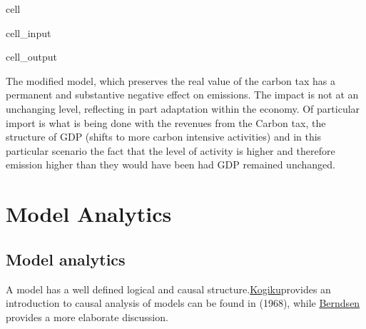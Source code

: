 \documentclass[letterpaper,10pt,english]{jupyterBook}
\begin{document}
\begin{sphinxuseclass}{cell}\begin{sphinxVerbatimInput}

\begin{sphinxuseclass}{cell_input}
\begin{sphinxVerbatim}[commandchars=\\\{\}]
\PYG{p}{[}\PYG{p}{]}
\end{sphinxVerbatim}

\end{sphinxuseclass}\end{sphinxVerbatimInput}
\begin{sphinxVerbatimOutput}

\begin{sphinxuseclass}{cell_output}
\noindent{}

\end{sphinxuseclass}\end{sphinxVerbatimOutput}

\end{sphinxuseclass}
\sphinxAtStartPar
The modified model, which preserves the real value of the carbon tax has a permanent and substantive negative effect on emissions. The impact is not at an unchanging level, reflecting in part adaptation within the economy. Of particular import is what is being done with the revenues from the Carbon tax, the structure of GDP (shifts to more carbon intensive activities) and in this particular scenario the fact that the level of activity is higher and therefore emission higher than they would have been had GDP remained unchanged.

\sphinxstepscope


\part{Model Analytics}

\sphinxstepscope


\chapter{Model analytics}
\label{\detokenize{content/06_ModelAnalytics/ModelStructure:model-analytics}}\label{\detokenize{content/06_ModelAnalytics/ModelStructure::doc}}
\sphinxAtStartPar
A model has a well defined logical and causal structure.\hyperlink{cite.content/99_BackMatter/References:id4}{Kogiku}provides an introduction to causal analysis of models can be found in (1968), while \hyperlink{cite.content/99_BackMatter/References:id2}{Berndsen} provides a more elaborate discussion.
\end{document}
